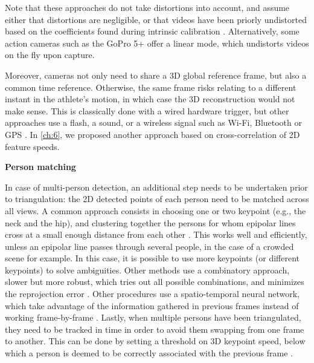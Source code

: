 Note that these approaches do not take distortions into account, and assume either that distortions are negligible, or that videos have been priorly undistorted based on the coefficients found during intrinsic calibration \cite{Jackson2016}. Alternatively, some action cameras such as the GoPro 5+ offer a linear mode, which undistorts videos on the fly upon capture. 

Moreover, cameras not only need to share a 3D global reference frame, but also a common time reference. Otherwise, the same frame risks relating to a different instant in the athlete's motion, in which case the 3D reconstruction would not make sense. This is classically done with a wired hardware trigger, but other approaches use a flash, a sound, or a wireless signal such as Wi-Fi, Bluetooth or GPS \cite{GoPro2022}. In \autoref{ch:6}, we proposed another approach based on cross-correlation of 2D feature speeds.

\vspace*{0.5cm}
\noindent\textbf{Person matching}  

In case of multi-person detection, an additional step needs to be undertaken prior to triangulation: the 2D detected points of each person need to be matched across all views. A common approach consists in choosing one or two keypoint (e.g., the neck and the hip), and clustering together the persons for whom epipolar lines cross at a small enough distance from each other \cite{Dong2019,Slembrouck2020,Kadkhodamohammadi2021}. This works well and efficiently, unless an epipolar line passes through several people, in the case of a crowded scene for example. In this case, it is possible to use more keypoints (or different keypoints) to solve ambiguities. Other methods use a combinatory approach, slower but more robust, which tries out all possible combinations, and minimizes the reprojection error \cite{Bridgeman2019,Chen2020c,Pagnon2021}. Other procedures use a spatio-temporal neural network, which take advantage of the information gathered in previous frames instead of working frame-by-frame \cite{Raaj2019}. Lastly, when multiple persons have been triangulated, they need to be tracked in time in order to avoid them swapping from one frame to another. This can be done by setting a threshold on 3D keypoint speed, below which a person is deemed to be correctly associated with the previous frame \cite{Bridgeman2019}.




